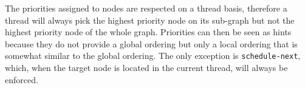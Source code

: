 The priorities assigned to nodes are respected on a thread basis, therefore a
thread will always pick the highest priority node on its sub-graph but not the
highest priority node of the whole graph. Priorities can then be seen as hints
because they do not provide a global ordering but only a local
ordering that is somewhat similar to the global ordering. The only
exception is \texttt{schedule-next}, which, when the target node is located in
the current thread, will always be enforced.
